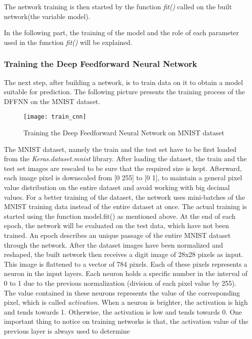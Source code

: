 The network training is then started by the function \emph{fit()} called on the built network(the variable model). 

\noindent
In the following part, the training of the model  and the role of each parameter used in the function \emph{fit()} will be explained. 


\subsubsection{Training the Deep Feedforward Neural Network}
The next step, after building a network, is to train data on it to obtain a model suitable for prediction.
The following picture presents the training process of the DFFNN on the MNIST dataset.

\begin{figure}[htb]
	\centering
	\texttt{[image: train\_cnn]}
	\caption[Train Deep Feedforward Neural Network]{Training the Deep Feedforward Neural Network on MNIST dataset \cite{[12]}} \label{Abb:train_cnn}
\end{figure}
The MNIST dataset, namely the train and the test set have to be first loaded from the \emph{Keras.dataset.mnist} library. 
After loading the dataset, 
the train and the test set images are rescaled to be sure that the required size is kept. 
Afterward, each image pixel is downscaled from [0 255] to [0 1], to maintain a general pixel value distribution on the entire dataset 
and avoid working with big decimal values. 
For a better training of the dataset, the network uses mini-batches of the MNIST training data instead of the entire dataset at once. 
The actual training is started using the function model.fit() as mentioned above. 
At the end of each epoch, the network will be evaluated on the test data, which have not been trained.
An epoch describes an unique passage of the entire MNIST dataset through the network. 
After the dataset images have been normalized and reshaped, the built network then receives a digit image of 28x28 pixels as input. 
This image is flattened to a vector of 784 pixels. 
Each of these pixels represents a neuron in the input layers. Each neuron holds a specific number
in the interval of 0 to 1 due to the previous normalization (division of each pixel value by 255). 
The value contained in these neurons represents the value of the corresponding 
pixel, which is called \emph{activation}. When a neuron is brighter, the activation is high and tends towards 1. 
Otherwise, the activation is low and tends towards 0. 
One important thing to notice on training networks is that, the activation value of the previous layer is always used to determine 
